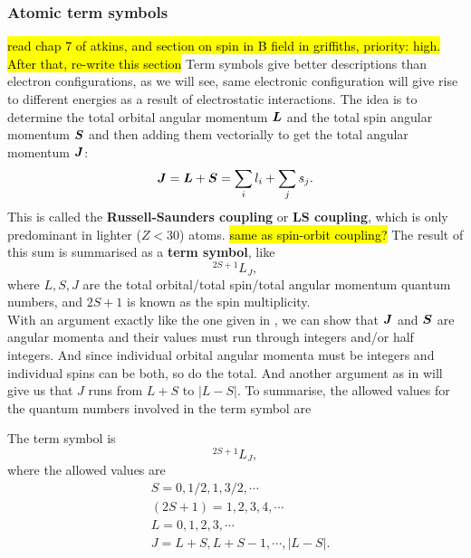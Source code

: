 \subsubsection{Atomic term symbols}
\label{term_symbols}
\hl{read chap 7 of atkins, and section on spin in B field in griffiths, priority: high. After that, re-write this section}
Term symbols give better descriptions than electron configurations, as we will see, same electronic configuration will give rise to different energies as a 
result of electrostatic interactions. The idea is to determine the total orbital 
angular momentum $\boldsymbol{L}$ and the total spin angular momentum $\boldsymbol{S}$ and 
then adding them vectorially to get the total angular momentum $\boldsymbol{J}$:
\begin{equation}
\boldsymbol{J}=\boldsymbol{L}+\boldsymbol{S}=\sum_i l_i+\sum_j s_j.
\end{equation}
This is called the \textbf{Russell-Saunders coupling} or \textbf{LS coupling}, 
which is only predominant in lighter ($Z<30$) atoms. \hl{same as spin-orbit coupling?}
The result of this sum is summarised as a \textbf{term symbol}, like
\begin{equation}
^{2S+1}L_J,
\end{equation}
where $L,S,J$ are the total orbital/total spin/total angular momentum quantum numbers, and $2S+1$ is known as the spin multiplicity. \\
With an argument exactly like the one given in , we can show 
that $\boldsymbol{J}$ and $\boldsymbol{S}$ are angular momenta and their values must run 
through integers and/or half integers. And since individual orbital angular 
momenta must be integers and individual spins can be both, so do the total. 
And another argument as in  will give us that $J$ runs from 
$L+S$ to $|L-S|$. To summarise, the allowed values for the quantum numbers 
involved in the term symbol are
\begin{prt}
The term symbol is
\begin{equation}
^{2S+1}L_J,
\end{equation}
where the allowed values are
\begin{equation}
\begin{aligned}
&S=0,1/2,1,3/2,\cdots\\
&(2S+1)=1,2,3,4,\cdots\\
&L=0,1,2,3,\cdots\\
&J=L+S,L+S-1,\cdots,|L-S|.
\end{aligned}
\end{equation}
\end{prt}

